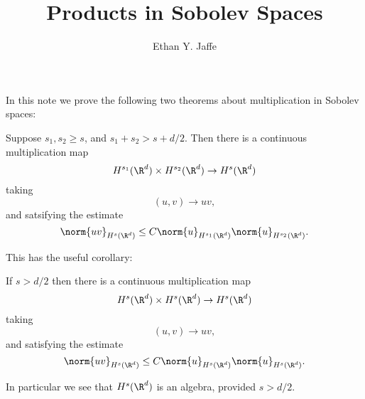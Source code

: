\documentclass[12pt]{article}
\title{Products in Sobolev Spaces}
\author{Ethan Y. Jaffe}
\date{}
\begin{document}
\maketitle
\setcounter{section}{1}
In this note we prove the following two theorems about multiplication in Sobolev spaces:
\begin{thm}\label{harder}Suppose $s_1,s_2 \geq s$, and $s_1+s_2 > s+d/2$. Then there is a continuous multiplication map
\[H^{s_1}(\R^d)\times H^{s_2}(\R^d) \to H^s(\R^d)\]
taking
\[(u,v) \to uv,\]
and satsifying the estimate
\[\norm{uv}_{H^s(\R^d)} \leq C\norm{u}_{H^{s_1}(\R^d)}\norm{u}_{H^{s_2}(\R^d)}.\]
\end{thm}
This has the useful corollary:
\begin{cor}\label{hard}If $s > d/2$ then there is a continuous multiplication map
\[H^{s}(\R^d)\times H^{s}(\R^d) \to H^s(\R^d)\]
taking
\[(u,v) \to uv,\]
and satisfying the estimate
\[\norm{uv}_{H^s(\R^d)} \leq C\norm{u}_{H^{s}(\R^d)}\norm{u}_{H^{s}(\R^d)}.\]
\end{cor}
In particular we see that $H^s(\R^d)$ is an algebra, provided $s > d/2$.
\end{document}
